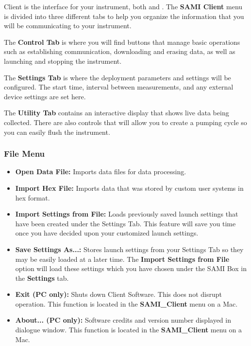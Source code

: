 \instType{} Client is the interface for your instrument, both \instType{} and \instType. The \textbf{SAMI Client} menu is divided into three different tabs to help you organize the information that you will be communicating to your instrument. 

The \textbf{Control Tab} is where you will find buttons that manage basic operations such as establishing communication, downloading and erasing data, as well as launching and stopping the instrument.

The \textbf{Settings Tab} is where the deployment parameters and settings will be configured. The start time, interval between measurements, and any external device settings are set here. 

The \textbf{Utility Tab} contains an interactive display that shows live data being collected. There are also controls that will allow you to create a pumping cycle so you can easily flush the instrument.


\subsubsection{File Menu}

\begin{itemize}
    \item[] \textbf{Open Data File:} Imports data files for data processing.
    
    \item[] \textbf{Import Hex File:} Imports data that was stored by custom user systems in hex format.
    
    \item[] \textbf{Import Settings from File:} Loads previously saved launch settings that have been created under the Settings Tab. This feature will save you time once you have decided upon your customized launch settings. 
    
    \item[] \textbf{Save Settings As...:} Stores launch settings from your Settings Tab so they may be easily loaded at a later time. The \textbf{Import Settings from File} option will load these settings which you have chosen under the SAMI Box in the \textbf{Settings} tab.
    
    \item[] \textbf{Exit (PC only):} Shuts down \instType{} Client Software. This does not disrupt \instType{} operation. This function is located in the \textbf{SAMI\_Client} menu on a Mac.
    
    \item[] \textbf{About... (PC only):} Software credits and version number displayed in dialogue window. This function is located in the \textbf{SAMI\_Client} menu on a Mac.
\end{itemize}


